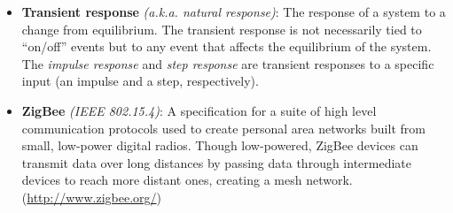 \begin{itemize}
\item{\textbf{Transient response} \emph{(a.k.a. natural response)}: The response of a system to a change from equilibrium. The transient response is not necessarily tied to ``on/off'' events but to any event that affects the equilibrium of the system. The \emph{impulse response} and \emph{step response} are transient responses to a specific input (an impulse and a step, respectively).}

\item{\textbf{ZigBee} \emph{(IEEE 802.15.4)}: A specification for a suite of high level communication protocols used to create personal area networks built from small, low-power digital radios. Though low-powered, ZigBee devices can transmit data over long distances by passing data through intermediate devices to reach more distant ones, creating a mesh network. (\url{http://www.zigbee.org/})}

\end{itemize}

\newpage \thispagestyle{empty} %

